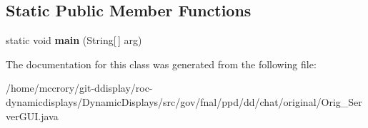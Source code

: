\subsection*{Static Public Member Functions}
\begin{DoxyCompactItemize}
\item 
\hypertarget{classgov_1_1fnal_1_1ppd_1_1dd_1_1chat_1_1original_1_1Orig__ServerGUI_a6e0896b287b2bb44e1eb39dc5cc4713a}{static void {\bfseries main} (String\mbox{[}$\,$\mbox{]} arg)}\label{classgov_1_1fnal_1_1ppd_1_1dd_1_1chat_1_1original_1_1Orig__ServerGUI_a6e0896b287b2bb44e1eb39dc5cc4713a}

\end{DoxyCompactItemize}


The documentation for this class was generated from the following file\-:\begin{DoxyCompactItemize}
\item 
/home/mccrory/git-\/ddisplay/roc-\/dynamicdisplays/\-Dynamic\-Displays/src/gov/fnal/ppd/dd/chat/original/Orig\-\_\-\-Server\-G\-U\-I.\-java\end{DoxyCompactItemize}
